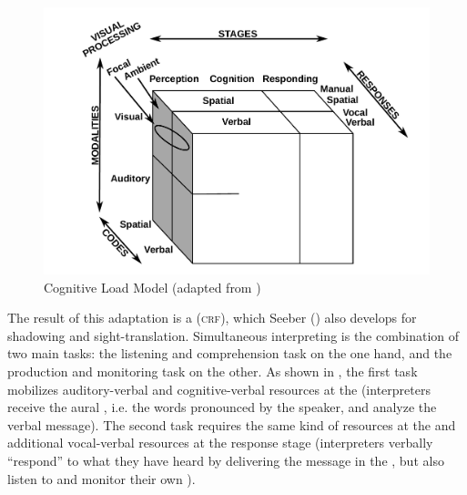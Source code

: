 \documentclass[output=paper]{langsci/langscibook}
\begin{document}
\begin{figure}
	\includegraphics[width=.7\textwidth]{figures/wickenstiescube.pdf}
\caption{Cognitive Load Model (adapted from \citealt[163]{Wickens2002})\label{fig:prandi:1}}
\end{figure}

The result of this adaptation is a  (\textsc{crf}), which Seeber (\citeyear{Seeber2007}) also develops for shadowing and sight-translation. Simultaneous interpreting is the combination of two main tasks: the listening and comprehension task on the one hand, and the production and monitoring task on the other. As shown in , the first task mobilizes auditory-verbal and cognitive-verbal resources at the  (interpreters receive the aural , i.e. the words pronounced by the speaker, and analyze the verbal message). The second task requires the same kind of resources at the  and additional vocal-verbal resources at the response stage (interpreters verbally ``respond'' to what they have heard by delivering the message in the , but also listen to and monitor their own ).
\end{document}
